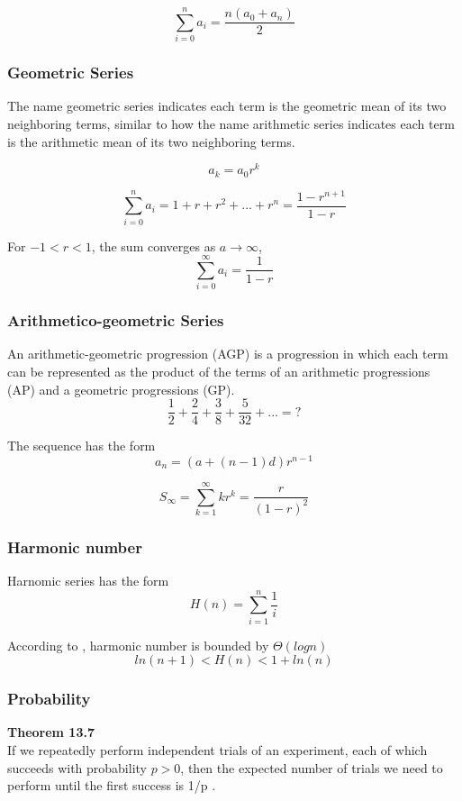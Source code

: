 \documentclass[12pt,article]{article}
\newenvironment{theorem}[2][Theorem]
    { \begin{mdframed}[backgroundcolor=blue!10] \textbf{#1 #2} \\}
    {  \end{mdframed}}
\begin{document}
$$\sum^{n}_{i=0}a_i = \frac{n(a_0 + a_n)}{2}$$

\subsubsection{Geometric Series}
The name geometric series indicates each term is the geometric mean of its two neighboring terms, similar to how the name arithmetic series indicates each term is the arithmetic mean of its two neighboring terms.

$$a_k = a_0 r^k$$

$$\sum^{n}_{i=0}a_i = 1 + r + r^2 + ... + r^n = \frac{1 - r^{n+1}}{1 - r}$$

For $-1 < r < 1$, the sum converges as $a \rightarrow \infty$, 
$$\sum^{\infty}_{i=0}a_i = \frac{1}{1 - r}$$

\subsubsection{Arithmetico-geometric Series}

An arithmetic-geometric progression (AGP) is a progression in which each term can be represented as the product of the terms of an arithmetic progressions (AP) and a geometric progressions (GP).
$$\frac{1}{2} + \frac{2}{4} + \frac{3}{8} + \frac{5}{32} + ... = ?$$

The sequence has the form
$$a_n = (a + (n-1)d)r^{n-1}$$

$$S_{\infty} = \sum^{\infty}_{k=1} kr^k = \frac{r}{(1-r)^2}$$

\subsubsection{Harmonic number}
Harnomic series has the form
$$H(n) = \sum_{i=1}^{n} \frac{1}{i}$$

According to \cite{kleinbergalgorithm}, harmonic number is bounded by $\Theta(logn)$
$$ln(n + 1) < H(n) < 1 + ln(n)$$

\subsubsection{Probability}

\begin{theorem}{13.7}
If we repeatedly perform independent trials of an experiment, each of
which succeeds with probability $p > 0$, then the expected number of trials we
need to perform until the first success is 1/p \cite{kleinbergalgorithm}.
    
\end{theorem}
\end{document}
